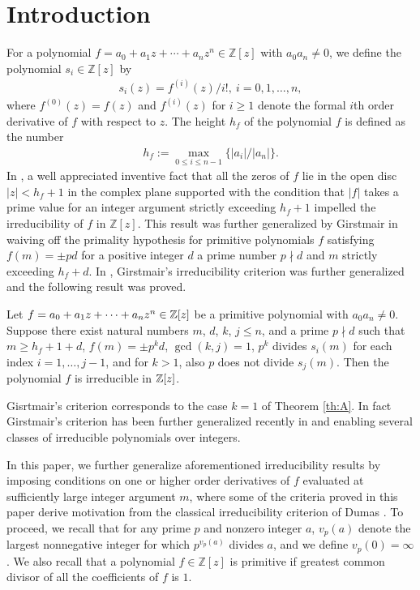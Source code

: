 \documentclass[12pt]{amsart}%
\begin{document}
\section{Introduction}
For a polynomial $f=a_0+a_1 z+\cdots+a_nz^n\in \mathbb{Z}[z]$ with $a_0a_n\neq 0$, we define the polynomial $s_i\in \mathbb{Z}[z]$ by
\begin{eqnarray*}
s_i(z)=f^{(i)}(z)/i!,~i=0,1,\ldots, n,
\end{eqnarray*}
where $f^{(0)}(z)=f(z)$ and $f^{(i)}(z)$ for $i\geq 1$ denote the formal $i$th order derivative of $f$ with respect to $z$. The height $h_f$ of the polynomial $f$ is defined as the number
\begin{eqnarray*}
h_f:=\max_{0\leq i\leq n-1}\{|a_i|/|a_n|\}.
\end{eqnarray*}
In \cite{Mu}, a well appreciated inventive fact that all the zeros of $f$  lie in the open disc $|z|<h_f + 1$ in the complex plane supported with the condition that $|f|$ takes a prime value for an integer argument strictly exceeding $h_f+1$ impelled the irreducibility of $f$ in $\mathbb{Z}[z]$. This result was further generalized by Girstmair in \cite{G} waiving off the primality hypothesis for primitive polynomials $f$ satisfying $f(m)=\pm pd$ for a positive integer $d$ a prime number $p\nmid d$ and $m$ strictly exceeding $h_f + d$.  In \cite{J-S-2}, Girstmair's irreducibility criterion was further generalized and the following result was proved.
\begin{thmx}[\cite{J-S-2}]\label{th:A}
Let $f=a_0+a_1 z+\cdots+a_nz^n\in \Bbb{Z}[z]$ be a primitive polynomial with $a_0a_n\neq 0$. Suppose there exist natural numbers $m$, $d$, $k$, $j\leq n$, and a prime $p\nmid d$ such that $m\geq h_f+1+d$, $f(m)=\pm p^k d$, $\gcd(k,j)=1$, $p^k$ divides $s_i(m)$ for each index $i=1,\ldots,j-1$, and for $k>1$, also $p$ does not divide $s_j(m)$. Then the polynomial $f$ is irreducible in $\Bbb{Z}[z]$.
\end{thmx}
Gisrtmair's criterion corresponds to the case $k=1$ of Theorem \ref{th:A}. In fact Girstmair's criterion has been further generalized recently in \cite{Singh24} and \cite{R-J-S} enabling several classes of irreducible polynomials over integers.

In this paper, we further generalize aforementioned irreducibility results by imposing conditions on one or higher order derivatives of $f$ evaluated at sufficiently large integer argument $m$, where some of the criteria proved in this paper derive motivation from the classical irreducibility criterion of Dumas \cite{D}. To proceed, we recall that for any prime $p$ and nonzero integer $a$, $v_p(a)$ denote the largest nonnegative integer for which $p^{v_p(a)}$ divides $a$, and we define $v_p(0)=\infty$. We also recall that a polynomial $f\in \mathbb{Z}[z]$ is primitive if greatest common divisor of all the coefficients of $f$ is $1$.
\end{document}
